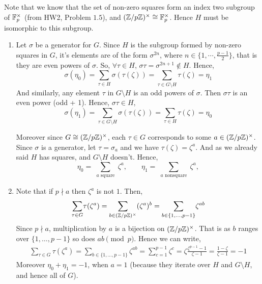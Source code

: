 \documentclass[12pt]{article}
\begin{document}
\begin{solution}
    \bbni

    Note that we know that the set of non-zero squares form an index two subgroup of $\mathbb F_p^\times$ (from HW2, Problem $1.5$), and $(\mathbb Z/p\mathbb Z)^\times \cong \mathbb F_p^\times$. Hence $H$ must be isomorphic to this subgroup. 

    \begin{enumerate}
        \item [(a)]           
        Let $\sigma$ be a generator for $G$. Since $H$ is the subgroup formed by non-zero squares in $G$, it's elements are of the form $\sigma^{2n}$, where $n \in \{1, \cdots, \frac{p-1}{2}\}$, that is they are even powers of $\sigma$. So, $\forall \tau \in H$, $\sigma \tau  = \sigma ^{2n + 1} \notin H$. Hence, 
        \[\sigma(\eta_0) =  \underset{\tau \in H}{\sum}{\sigma(\tau(\zeta))} =\underset{\tau \in G \setminus H}{\sum}{\tau(\zeta)} = \eta_1 \]
        And similarly, any element $\tau$ in $G \setminus H$ is an odd powers of $\sigma$. Then $\sigma \tau$ is an even power (odd + 1). Hence, $\sigma \tau \in H$, 
        \[\sigma(\eta_1) =  \underset{\tau \in G \setminus H}{\sum}{\sigma(\tau(\zeta))} =\underset{\tau \in H}{\sum}{\tau(\zeta)} = \eta_0 \]

        Moreover since $G \cong (\mathbb Z/p\mathbb Z)^\times$, each $\tau \in G$ corresponds to some $a \in (\mathbb Z/p\mathbb Z)^\times$. Since $\sigma$ is a generator, let $\tau = \sigma_a$ and we have $\tau(\zeta) = \zeta^a$. And as we already said $H$ has squares, and $G\setminus H$ doesn't. Hence, 
        \[
        \eta_0 = \sum_{\substack{a \text{ square}}} \zeta^a,
        \qquad
        \eta_1 = \sum_{\substack{a \text{ nonsquare}}} \zeta^a,
        \]

        \item [(b)] Note that if $p \nmid a$ then $\zeta^a$ is not $1$. Then, 
        \begin{align*}
            \underset{\tau \in G}{\sum} \tau (\zeta^a) = \underset{b \in (\mathbb Z/p\mathbb Z)^\times}{\sum} (\zeta^a)^b = \underset{b \in \{1, \ldots, p-1\}}{\sum} \zeta^{ab} 
        \end{align*}
        Since $p \nmid a$, multiplication by $a$ is a bijection on $(\mathbb Z/p\mathbb Z)^\times$. That is as $b$ ranges over $\{1, \ldots, p-1\}$ so does $ab \pmod p$. Hence we can write, 
        \begin{align*}
            \underset{\tau \in G}{\sum} \tau (\zeta^a) = \underset{b \in \{1, \ldots, p-1\}}{\sum} \zeta^{ab}  = \sum_{c = 1}^{p-1}\zeta^{c} = \zeta \frac{\zeta^{p-1} - 1}{\zeta-1} = \frac{1-\zeta}{\zeta - 1} = -1
        \end{align*}
        Moreover $\eta_0 + \eta_1 = -1$, when $a =1$ (because they iterate over $H$ and $G \setminus H$, and hence all of $G$). 


\end{enumerate}
\end{solution}
\end{document}
